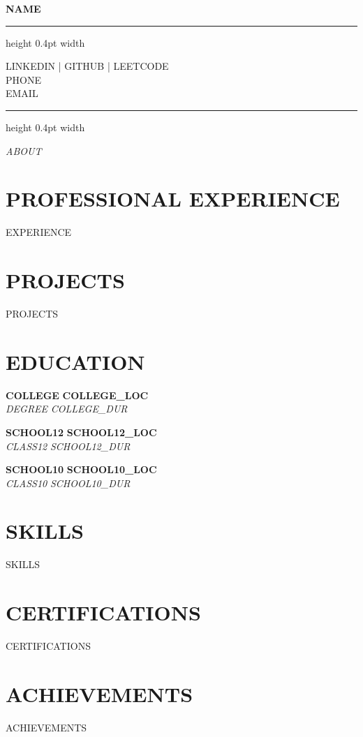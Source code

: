 \documentclass[11pt,letterpaper]{article}
\newcommand{\name}[1]{
  \begin{center}
    \Huge\textbf{#1}
  \end{center}
  \vspace{-0.5em}
  \hrule height 0.4pt width \textwidth
  \vspace{0.5em}
}
\newcommand{\contact}[3]{
  \begin{center}
    #1 \\
    #2 \\
    #3
  \end{center}
  \vspace{-0.5em}
  \hrule height 0.4pt width \textwidth
  \vspace{0.5em}
}
\newcommand{\role}[4]{
  \begin{center}
    \textbf{\textnormal{#1}} \hfill \textbf{\textnormal{#2}} \\
    \textit{\textnormal{#3}} \hfill \textit{\textnormal{#4}}
  \end{center}
}
\begin{document}
\name{\textnormal{{{NAME}}}}

\vspace{-0.5em}
\contact{\textnormal{{{LINKEDIN}}} \quad | \quad \textnormal{{{GITHUB}}} \quad | \quad \textnormal{{{LEETCODE}}}}{\textnormal{{{PHONE}}}}{\textnormal{{{EMAIL}}}}

\vspace{-0.5em}
\begin{center}
\textit{\textnormal{{{ABOUT}}}}
\end{center}

\section{PROFESSIONAL EXPERIENCE}
\textnormal{{{EXPERIENCE}}}

\section{PROJECTS}
\textnormal{{{PROJECTS}}}

\section{EDUCATION}

\vspace{0.5em}
\role{{{COLLEGE}}}{{{COLLEGE_LOC}}}{{{DEGREE}}}{{{COLLEGE_DUR}}}

\vspace{0.5em}
\role{{{SCHOOL12}}}{{{SCHOOL12_LOC}}}{{{CLASS12}}}{{{SCHOOL12_DUR}}}

\vspace{0.5em}
\role{{{SCHOOL10}}}{{{SCHOOL10_LOC}}}{{{CLASS10}}}{{{SCHOOL10_DUR}}}

\section{SKILLS}
\textnormal{{{SKILLS}}}

\section{CERTIFICATIONS}
\textnormal{{{CERTIFICATIONS}}}

\section{ACHIEVEMENTS}
\textnormal{{{ACHIEVEMENTS}}}
\end{document}
